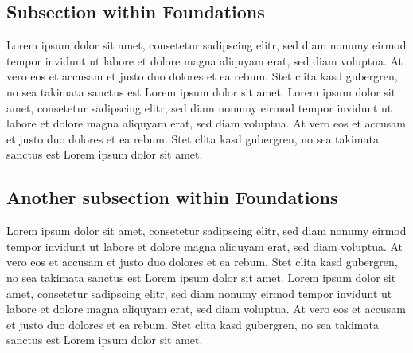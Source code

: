 \documentclass[a4paper]{article}
\begin{document}

\subsection{Subsection within Foundations} %
\label{sub:subsection_within_foundations}
Lorem ipsum dolor sit amet, consetetur \cite{NaturalScene} sadipscing elitr, sed diam nonumy eirmod tempor invidunt ut labore et dolore magna aliquyam erat, sed diam voluptua. At vero eos et accusam et justo duo dolores et ea rebum. Stet clita kasd gubergren, no sea takimata sanctus est Lorem ipsum dolor sit amet. Lorem ipsum dolor sit amet, consetetur sadipscing elitr, sed diam nonumy eirmod tempor invidunt ut labore et dolore magna aliquyam erat, sed diam voluptua. At vero eos et accusam et justo duo dolores et ea rebum. Stet clita kasd gubergren, no sea takimata sanctus est Lorem ipsum dolor sit amet.

\subsection{Another subsection within Foundations} %
\label{sub:another_subsection_within_foundations}
Lorem ipsum dolor sit amet, consetetur sadipscing elitr, sed diam nonumy eirmod tempor invidunt ut labore et dolore magna aliquyam erat, sed diam voluptua. At vero eos et accusam et justo duo dolores et ea rebum. Stet clita kasd gubergren, no sea takimata sanctus est Lorem ipsum dolor sit amet. Lorem ipsum dolor sit amet, consetetur sadipscing elitr, sed diam nonumy eirmod tempor invidunt ut labore et dolore magna aliquyam erat, sed diam voluptua. At vero eos et accusam et justo duo dolores et ea rebum. Stet clita kasd gubergren, no sea takimata sanctus est Lorem ipsum dolor sit amet.



\newpage 


\end{document}
